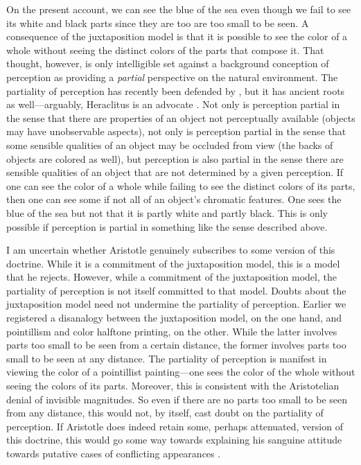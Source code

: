 On the present account, we can see the blue of the sea even though we fail to see its white and black parts since they are too are too small to be seen. A consequence of the juxtaposition model is that it is possible to see the color of a whole without seeing the distinct colors of the parts that compose it. That thought, however, is only intelligible set against a background conception of perception as providing a \emph{partial} perspective on the natural environment. The partiality of perception has recently been defended by \citet{Hilbert:1987jq}, but it has ancient roots as well---arguably, Heraclitus is an advocate \citep[see][]{Burnyeat:1979mv,Kalderon:2006tg}. Not only is perception partial in the sense that there are properties of an object not perceptually available (objects may have unobservable aspects), not only is perception partial in the sense that some sensible qualities of an object may be occluded from view (the backs of objects are colored as well), but perception is also partial in the sense there are sensible qualities of an object that are not determined by a given perception. If one can see the color of a whole while failing to see the distinct colors of its parts, then one can see some if not all of an object's chromatic features. One sees the blue of the sea but not that it is partly white and partly black. This is only possible if perception is partial in something like the sense described above. 

I am uncertain whether Aristotle genuinely subscribes to some version of this doctrine. While it is a commitment of the juxtaposition model, this is a model that he rejects. However, while a commitment of the juxtaposition model, the partiality of perception is not itself committed to that model. Doubts about the juxtaposition model need not undermine the partiality of perception. Earlier we registered a disanalogy between the juxtaposition model, on the one hand, and pointillism and color halftone printing, on the other. While the latter involves parts too small to be seen from a certain distance, the former involves parts too small to be seen at any distance. The partiality of perception is manifest in viewing the color of a pointillist painting---one sees the color of the whole without seeing the colors of its parts. Moreover, this is consistent with the Aristotelian denial of invisible magnitudes. So even if there are no parts too small to be seen from any distance, this would not, by itself, cast doubt on the partiality of perception. If Aristotle does indeed retain some, perhaps attenuated, version of this doctrine, this would go some way towards explaining his sanguine attitude towards putative cases of conflicting appearances \citep[on how the partiality of perception can help dissipate some appearances of conflict see][]{Kalderon:2006tg}.

